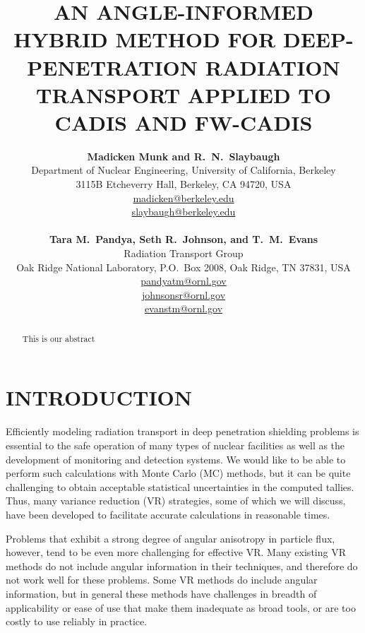 \documentclass[12pt]{article}
\title{AN ANGLE-INFORMED HYBRID METHOD FOR DEEP-PENETRATION RADIATION TRANSPORT APPLIED TO CADIS AND FW-CADIS}
\author{ 
  \textbf{Madicken Munk and R.~N.~Slaybaugh} \\
  Department of Nuclear Engineering, University of California, Berkeley \\
  3115B Etcheverry Hall, Berkeley, CA 94720, USA\\
  \href{mailto:madicken@berkeley.edu}{madicken@berkeley.edu}\\
  \href{mailto:slaybaugh@berkeley.edu}{slaybaugh@berkeley.edu}\\
  \\
  \textbf{Tara M.~Pandya, Seth R.~Johnson, and T.~M.~Evans}\\
  Radiation Transport Group\\
  Oak Ridge National Laboratory, P.O.\ Box 2008, Oak Ridge, TN 37831, USA\\
  \href{mailto:pandyatm@ornl.gov}{pandyatm@ornl.gov}\\
  \href{mailto:johnsonsr@ornl.gov}{johnsonsr@ornl.gov}\\
  \href{mailto:evanstm@ornl.gov}{evanstm@ornl.gov}
  }
\begin{document}


\maketitle

\begin{abstract}
This is our abstract
\end{abstract}



%
\section{INTRODUCTION}
\label{sect::intro}

Efficiently modeling radiation transport in deep penetration shielding problems is essential to the safe operation of many types of nuclear facilities as well as the development of monitoring and detection systems. We would like to be able to perform such calculations with Monte Carlo (MC) methods, but it can be quite challenging to obtain acceptable statistical uncertainties in the computed tallies. Thus, many variance reduction (VR) strategies, some of which we will discuss, have been developed to facilitate accurate calculations in reasonable times. 

Problems that exhibit a strong degree of angular anisotropy in particle flux, however, tend to be even more challenging for effective VR.
Many existing VR methods do not include angular information in their techniques, and therefore do not work well for these problems.  
Some VR methods do include angular information, but in general these methods have challenges in breadth of applicability or ease of use that make them inadequate as broad tools, or are too costly to use reliably in practice.
\end{document}
